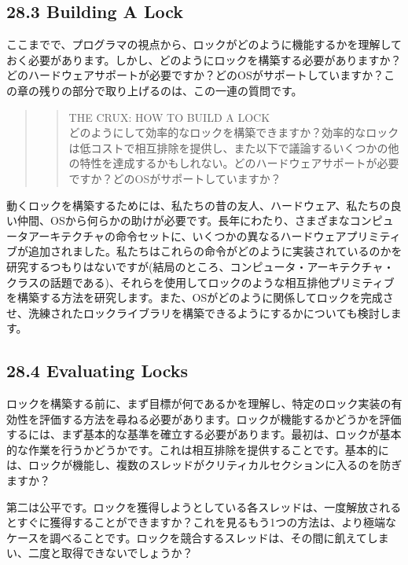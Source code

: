 \hypertarget{building-a-lock}{%
\subsection*{28.3 Building A Lock}\label{building-a-lock}}

ここまでで、プログラマの視点から、ロックがどのように機能するかを理解しておく必要があります。しかし、どのようにロックを構築する必要がありますか？どのハードウェアサポートが必要ですか？どのOSがサポートしていますか？この章の残りの部分で取り上げるのは、この一連の質問です。

\begin{quote}
\begin{quote}
THE CRUX: HOW TO BUILD A LOCK\\
どのようにして効率的なロックを構築できますか？効率的なロックは低コストで相互排除を提供し、また以下で議論するいくつかの他の特性を達成するかもしれない。どのハードウェアサポートが必要ですか？どのOSがサポートしていますか？
\end{quote}
\end{quote}

動くロックを構築するためには、私たちの昔の友人、ハードウェア、私たちの良い仲間、OSから何らかの助けが必要です。長年にわたり、さまざまなコンピュータアーキテクチャの命令セットに、いくつかの異なるハードウェアプリミティブが追加されました。私たちはこれらの命令がどのように実装されているのかを研究するつもりはないですが(結局のところ、コンピュータ・アーキテクチャ・クラスの話題である)、それらを使用してロックのような相互排他プリミティブを構築する方法を研究します。また、OSがどのように関係してロックを完成させ、洗練されたロックライブラリを構築できるようにするかについても検討します。

\hypertarget{evaluating-locks}{%
\subsection*{28.4 Evaluating Locks}\label{evaluating-locks}}

ロックを構築する前に、まず目標が何であるかを理解し、特定のロック実装の有効性を評価する方法を尋ねる必要があります。ロックが機能するかどうかを評価するには、まず基本的な基準を確立する必要があります。最初は、ロックが基本的な作業を行うかどうかです。これは相互排除を提供することです。基本的には、ロックが機能し、複数のスレッドがクリティカルセクションに入るのを防ぎますか？

第二は公平です。ロックを獲得しようとしている各スレッドは、一度解放されるとすぐに獲得することができますか？これを見るもう1つの方法は、より極端なケースを調べることです。ロックを競合するスレッドは、その間に飢えてしまい、二度と取得できないでしょうか？

